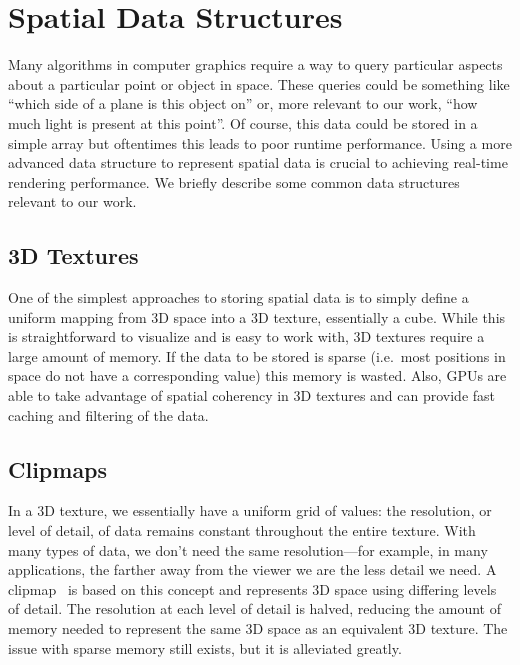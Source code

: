 

\section{Spatial Data Structures}
Many algorithms in computer graphics require a way to query particular aspects about a particular point or object in space. These queries could be something like ``which side of a plane is this object on'' or, more relevant to our work, ``how much light is present at this point''. Of course, this data could be stored in a simple array but oftentimes this leads to poor runtime performance. Using a more advanced data structure to represent spatial data is crucial to achieving real-time rendering performance. We briefly describe some common data structures relevant to our work.

\subsection{3D Textures}
One of the simplest approaches to storing spatial data is to simply define a uniform mapping from 3D space into a 3D texture, essentially a cube. While this is straightforward to visualize and is easy to work with, 3D textures require a large amount of memory. If the data to be stored is sparse (i.e.\ most positions in space do not have a corresponding value) this memory is wasted. Also, GPUs are able to take advantage of spatial coherency in 3D textures and can provide fast caching and filtering of the data.

\subsection{Clipmaps}
In a 3D texture, we essentially have a uniform grid of values: the resolution, or level of detail, of data remains constant throughout the entire texture. With many types of data, we don't need the same resolution---for example, in many applications, the farther away from the viewer we are the less detail we need. A clipmap~\cite{Tanner:1998:CVM:280814.280855, Losasso:2004:GCT:1015706.1015799} is based on this concept and represents 3D space using differing levels of detail. The resolution at each level of detail is halved, reducing the amount of memory needed to represent the same 3D space as an equivalent 3D texture. The issue with sparse memory still exists, but it is alleviated greatly.

